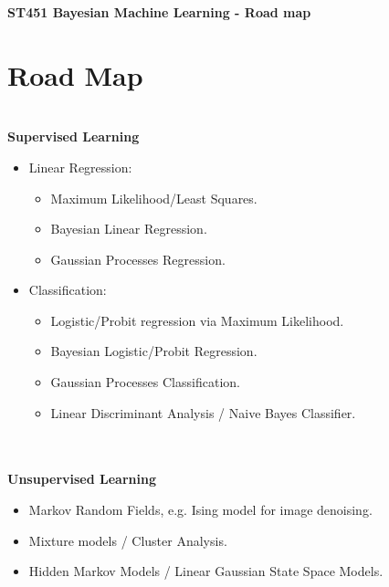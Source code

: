 \documentclass{article}
\begin{document}
\begin{center}
\Large {\bf ST451 Bayesian Machine Learning - Road map}
\end{center}
\vspace{1cm}
\normalsize
%
\large
%
\section*{Road Map}
$\text{ }$
\ \\
\textbf{Supervised Learning}
\begin{itemize}
\item Linear Regression: 
\begin{itemize}
\item Maximum Likelihood/Least Squares.
\item Bayesian Linear Regression.
\item Gaussian Processes Regression.\\
\end{itemize}
\item Classification:
\begin{itemize}
\item Logistic/Probit regression via Maximum Likelihood.
\item Bayesian Logistic/Probit Regression.
\item Gaussian Processes Classification.
\item Linear Discriminant Analysis / Naive Bayes Classifier.\\
\end{itemize}
\end{itemize}
\ \\
\ \\
\textbf{Unsupervised Learning}
\begin{itemize}
\item Markov Random Fields, e.g. Ising model for image denoising.\\
\item Mixture models / Cluster Analysis.\\
\item Hidden Markov Models / Linear Gaussian State Space Models.
\end{itemize}
\end{document}
